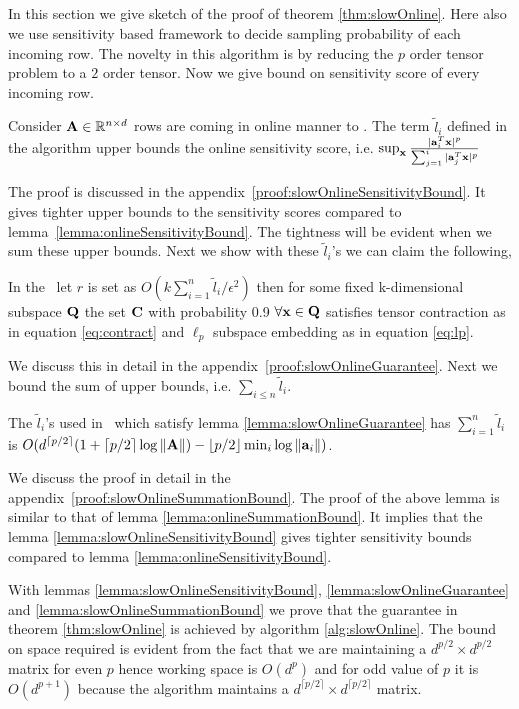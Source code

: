 \subsection{}
In this section we give sketch of the proof of theorem \ref{thm:slowOnline}. Here also we use sensitivity based framework to decide sampling probability of each incoming row. The novelty in this algorithm is by reducing the $p$ order tensor problem to a $2$ order tensor. Now we give bound on sensitivity score of every incoming row.
% 
\begin{lemma}{\label{lemma:slowOnlineSensitivityBound}}
 Consider $\mathbf{A} \in \mathbb{R}^{n \times d}$ rows are coming in online manner to . The term $\tilde{l}_{i}$ defined in the algorithm upper bounds the online sensitivity score, i.e. $\sup_{\mathbf{x}}\frac{|\mathbf{a}_{i}^{T}\mathbf{x}|^{p}}{\sum_{j=1}^{i}|\mathbf{a}_{j}^{T}\mathbf{x}|^{p}}$
\end{lemma}
% 
The proof is discussed in the appendix~\ref{proof:slowOnlineSensitivityBound}. It gives tighter upper bounds to the sensitivity scores compared to lemma~\ref{lemma:onlineSensitivityBound}. The tightness will be evident when we sum these upper bounds. Next we show with these $\tilde{l}_{i}$'s we can claim the following,
\begin{lemma}{\label{lemma:slowOnlineGuarantee}}
 In the ~let $r$ is set as $O(k\sum_{i=1}^{n}\tilde{l}_{i}/\epsilon^{2})$ then for some fixed k-dimensional subspace $\mathbf{Q}$ the set $\mathbf{C}$ with probability 0.9 $\forall \mathbf{x} \in \mathbf{Q}$ satisfies tensor contraction as in equation \eqref{eq:contract} and $\ell_{p}$ subspace embedding as in equation \eqref{eq:lp}.
\end{lemma}
% 
We discuss this in detail in the appendix~\ref{proof:slowOnlineGuarantee}. Next we bound the sum of upper bounds, i.e. $\sum_{i \leq n} \tilde{l}_{i}$.
\begin{lemma}{\label{lemma:slowOnlineSummationBound}}
 The $\tilde{l}_{i}$'s used in ~which satisfy lemma \ref{lemma:slowOnlineGuarantee} has
 $\sum_{i=1}^{n} \tilde{l}_{i}$ is $O(d^{\lceil p/2 \rceil}(1+\lceil p/2 \rceil\log \|\mathbf{A}\|) - \lfloor p/2 \rfloor\min_{i}\log \|\mathbf{a}_{i}\|)$.
\end{lemma}
% 
We discuss the proof in detail in the appendix~\ref{proof:slowOnlineSummationBound}. The proof of the above lemma is similar to that of lemma \ref{lemma:onlineSummationBound}. It implies that the lemma \ref{lemma:slowOnlineSensitivityBound} gives tighter sensitivity bounds compared to lemma \ref{lemma:onlineSensitivityBound}. 

With lemmas \ref{lemma:slowOnlineSensitivityBound}, \ref{lemma:slowOnlineGuarantee} and \ref{lemma:slowOnlineSummationBound} we prove that the guarantee in theorem \ref{thm:slowOnline} is achieved by algorithm \ref{alg:slowOnline}. The bound on space required is evident from the fact that we are maintaining a $d^{p/2} \times d^{p/2}$ matrix for even $p$ hence working space is $O(d^p)$ and for odd value of $p$ it is $O(d^{p+1})$ because the algorithm maintains a $d^{\lceil p/2 \rceil} \times d^{\lceil p/2 \rceil}$ matrix. 